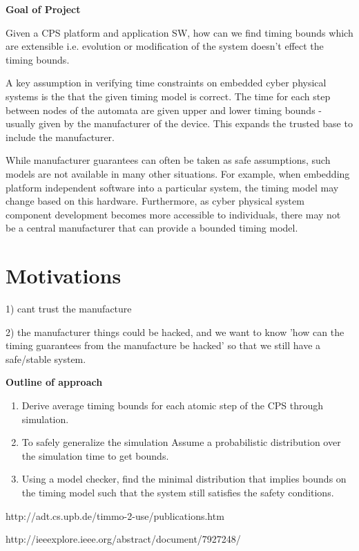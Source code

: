 
\textbf{Goal of Project}

Given a CPS platform and application SW, how can we find timing bounds which are extensible i.e. evolution or modification of the system doesn't effect the timing bounds. 

A key assumption in verifying time constraints on  embedded cyber physical systems is the that the given timing model is correct.
The time for each step between nodes of the automata are given upper and lower timing bounds - usually given by the manufacturer of the device.
This expands the trusted base to include the manufacturer.

While manufacturer guarantees can often be taken as safe assumptions, such models are not available in many other situations.
For example, when embedding platform independent software into a particular system, the timing model may change based on this hardware.
Furthermore, as cyber physical system component development becomes more accessible to individuals, there may not be a central manufacturer that can provide a bounded timing model.

\section{Motivations}

1) cant trust the manufacture

2) the manufacturer things could be hacked, and we want to know 'how can the timing guarantees from the manufacture be hacked' so that we still have a safe/stable system.


\textbf{Outline of approach}

\begin{enumerate}
    \item Derive average timing bounds for each atomic step of the CPS through simulation.
    \item To safely generalize the simulation Assume a probabilistic distribution over the simulation time to get bounds.
    \item Using a model checker, find the minimal distribution that implies bounds on the timing model such that the system still satisfies the safety conditions.
\end{enumerate}


\iffalse

http://adt.cs.upb.de/timmo-2-use/publications.htm

http://ieeexplore.ieee.org/abstract/document/7927248/

